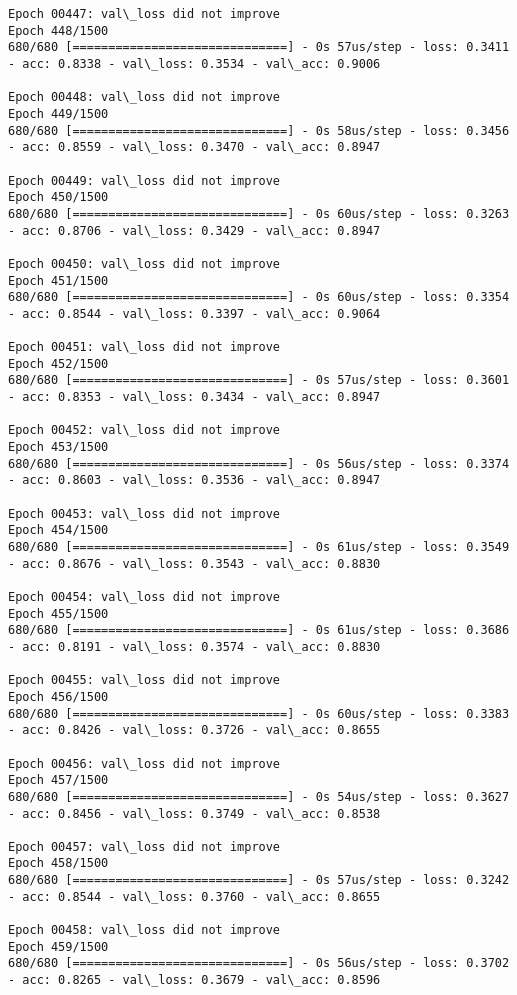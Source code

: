 \documentclass[11pt]{article}
\begin{document}
\begin{Verbatim}[commandchars=\\\{\}]
Epoch 00447: val\_loss did not improve
Epoch 448/1500
680/680 [==============================] - 0s 57us/step - loss: 0.3411 - acc: 0.8338 - val\_loss: 0.3534 - val\_acc: 0.9006

Epoch 00448: val\_loss did not improve
Epoch 449/1500
680/680 [==============================] - 0s 58us/step - loss: 0.3456 - acc: 0.8559 - val\_loss: 0.3470 - val\_acc: 0.8947

Epoch 00449: val\_loss did not improve
Epoch 450/1500
680/680 [==============================] - 0s 60us/step - loss: 0.3263 - acc: 0.8706 - val\_loss: 0.3429 - val\_acc: 0.8947

Epoch 00450: val\_loss did not improve
Epoch 451/1500
680/680 [==============================] - 0s 60us/step - loss: 0.3354 - acc: 0.8544 - val\_loss: 0.3397 - val\_acc: 0.9064

Epoch 00451: val\_loss did not improve
Epoch 452/1500
680/680 [==============================] - 0s 57us/step - loss: 0.3601 - acc: 0.8353 - val\_loss: 0.3434 - val\_acc: 0.8947

Epoch 00452: val\_loss did not improve
Epoch 453/1500
680/680 [==============================] - 0s 56us/step - loss: 0.3374 - acc: 0.8603 - val\_loss: 0.3536 - val\_acc: 0.8947

Epoch 00453: val\_loss did not improve
Epoch 454/1500
680/680 [==============================] - 0s 61us/step - loss: 0.3549 - acc: 0.8676 - val\_loss: 0.3543 - val\_acc: 0.8830

Epoch 00454: val\_loss did not improve
Epoch 455/1500
680/680 [==============================] - 0s 61us/step - loss: 0.3686 - acc: 0.8191 - val\_loss: 0.3574 - val\_acc: 0.8830

Epoch 00455: val\_loss did not improve
Epoch 456/1500
680/680 [==============================] - 0s 60us/step - loss: 0.3383 - acc: 0.8426 - val\_loss: 0.3726 - val\_acc: 0.8655

Epoch 00456: val\_loss did not improve
Epoch 457/1500
680/680 [==============================] - 0s 54us/step - loss: 0.3627 - acc: 0.8456 - val\_loss: 0.3749 - val\_acc: 0.8538

Epoch 00457: val\_loss did not improve
Epoch 458/1500
680/680 [==============================] - 0s 57us/step - loss: 0.3242 - acc: 0.8544 - val\_loss: 0.3760 - val\_acc: 0.8655

Epoch 00458: val\_loss did not improve
Epoch 459/1500
680/680 [==============================] - 0s 56us/step - loss: 0.3702 - acc: 0.8265 - val\_loss: 0.3679 - val\_acc: 0.8596


\end{Verbatim}
\end{document}
